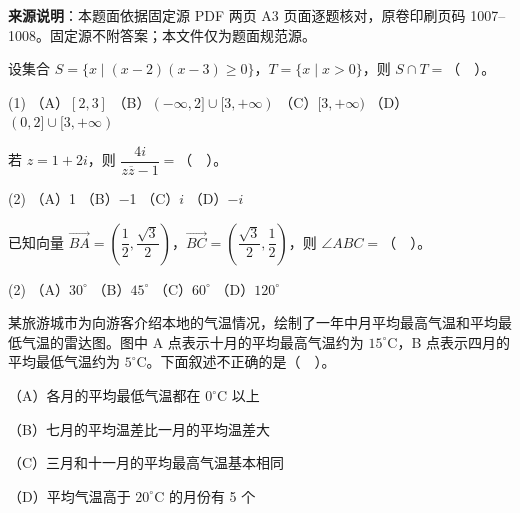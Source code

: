 


\begin{gktip}
\textbf{来源说明}：本题面依据固定源 PDF 两页 A3 页面逐题核对，原卷印刷页码 1007–1008。固定源不附答案；本文件仅为题面规范源。
\end{gktip}


\begin{question}
设集合 \(S=\{x\mid (x-2)(x-3)\geq 0\}\)，\(T=\{x\mid x>0\}\)，则 \(S\cap T=\)（　）。

\begin{gkopts}(1)
\task （A）\([2,3]\)
\task （B）\((-\infty,2]\cup[3,+\infty)\)
\task （C）\([3,+\infty)\)
\task （D）\((0,2]\cup[3,+\infty)\)
\end{gkopts}

\end{question}
\begin{question}
若 \(z=1+2i\)，则 \(\dfrac{4i}{z\overline z-1}=\)（　）。

\begin{gkopts}(2)
\task （A）1
\task （B）$-$1
\task （C）\(i\)
\task （D）\(-i\)
\end{gkopts}

\end{question}
\begin{question}
已知向量 \(\overrightarrow{BA}=\left(\dfrac12,\dfrac{\sqrt3}{2}\right)\)，\(\overrightarrow{BC}=\left(\dfrac{\sqrt3}{2},\dfrac12\right)\)，则 \(\angle ABC=\)（　）。

\begin{gkopts}(2)
\task （A）\(30^\circ\)
\task （B）\(45^\circ\)
\task （C）\(60^\circ\)
\task （D）\(120^\circ\)
\end{gkopts}

\Needspace{0.4\textheight}
\end{question}
\begin{question}
某旅游城市为向游客介绍本地的气温情况，绘制了一年中月平均最高气温和平均最低气温的雷达图。图中 A 点表示十月的平均最高气温约为 \(15^\circ\mathrm C\)，B 点表示四月的平均最低气温约为 \(5^\circ\mathrm C\)。下面叙述不正确的是（　）。

（A）各月的平均最低气温都在 \(0^\circ\mathrm C\) 以上

（B）七月的平均温差比一月的平均温差大

（C）三月和十一月的平均最高气温基本相同

（D）平均气温高于 \(20^\circ\mathrm C\) 的月份有 5 个
\nopagebreak[4]
\begin{center}\end{center}
\nopagebreak[4]
\end{question}

